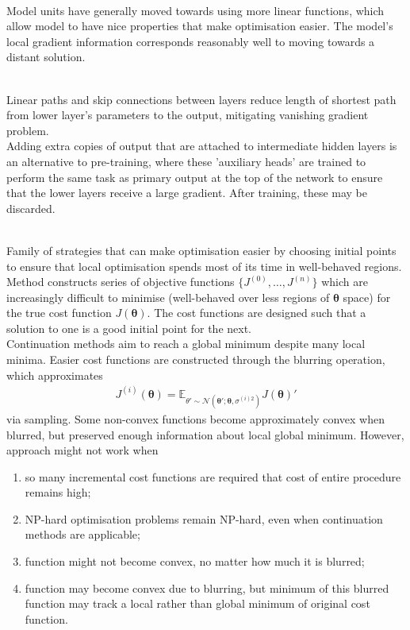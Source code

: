 \begin{remark} \\
Model units have generally moved towards using more linear functions, which allow model to have nice properties that make optimisation easier. The model's local gradient information corresponds reasonably well to moving towards a distant solution.
\end{remark}

\begin{remark} \\
Linear paths and skip connections between layers reduce length of shortest path from lower layer's parameters to the output, mitigating vanishing gradient problem.\\
Adding extra copies of output that are attached to intermediate hidden layers is an alternative to pre-training, where these 'auxiliary heads' are trained to perform the same task as primary output at the top of the network to ensure that the lower layers receive a large gradient. After training, these may be discarded.
\end{remark}

\begin{remark} \\
Family of strategies that can make optimisation easier by choosing initial points to ensure that local optimisation spends most of its time in well-behaved regions. Method constructs series of objective functions $\{J^{(0)}, \ldots, J^{(n)}\}$ which are increasingly difficult to minimise (well-behaved over less regions of $\bm{\theta}$ space) for the true cost function $J(\bm{\theta})$. The cost functions are designed such that a solution to one is a good initial point for the next.\\
Continuation methods aim to reach a global minimum despite many local minima. Easier cost functions are constructed through the blurring operation, which approximates
\begin{align}
J^{(i)}(\bm{\theta}) = \mathbb{E}_{\theta' \sim \mathcal{N}(\bm{\theta}'; \bm{\theta}, \sigma^{(i)2})} J(\bm{\theta})' \nonumber
\end{align}
via sampling. Some non-convex functions become approximately convex when blurred, but preserved enough information about local global minimum. However, approach might not work when
\begin{enumerate}[label=\roman*.]
\setlength{\itemsep}{0pt}
\item so many incremental cost functions are required that cost of entire procedure remains high;
\item NP-hard optimisation problems remain NP-hard, even when continuation methods are applicable;
\item function might not become convex, no matter how much it is blurred;
\item function may become convex due to blurring, but minimum of this blurred function may track a local rather than global minimum of original cost function.
\end{enumerate}
\end{remark}

